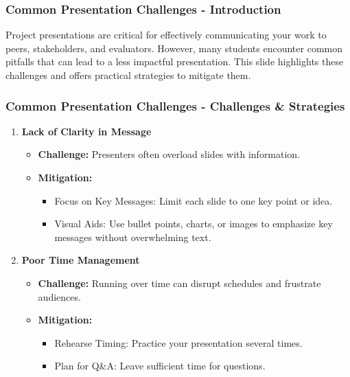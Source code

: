 \documentclass[aspectratio=169]{beamer}
\begin{document}
\begin{frame}[fragile]
  \frametitle{Common Presentation Challenges - Introduction}
  Project presentations are critical for effectively communicating your work to peers, stakeholders, and evaluators. However, many students encounter common pitfalls that can lead to a less impactful presentation. This slide highlights these challenges and offers practical strategies to mitigate them.
\end{frame}

\begin{frame}[fragile]
  \frametitle{Common Presentation Challenges - Challenges & Strategies}
  \begin{enumerate}
    \item \textbf{Lack of Clarity in Message}
    \begin{itemize}
      \item \textbf{Challenge:} Presenters often overload slides with information.
      \item \textbf{Mitigation:} 
      \begin{itemize}
        \item Focus on Key Messages: Limit each slide to one key point or idea.
        \item Visual Aids: Use bullet points, charts, or images to emphasize key messages without overwhelming text.
      \end{itemize}
    \end{itemize}

    \item \textbf{Poor Time Management}
    \begin{itemize}
      \item \textbf{Challenge:} Running over time can disrupt schedules and frustrate audiences.
      \item \textbf{Mitigation:} 
      \begin{itemize}
        \item Rehearse Timing: Practice your presentation several times.
        \item Plan for Q\&A: Leave sufficient time for questions.
      \end{itemize}
    \end{itemize}
  \end{enumerate}
\end{frame}
\end{document}
